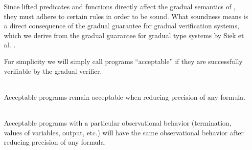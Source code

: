 Since lifted predicates and functions directly affect the gradual semantics of \gvl, they must adhere to certain rules in order to be sound.
What soundness means is a direct consequence of the gradual guarantee for gradual verification systems, which we derive from the gradual guarantee for gradual type systems by Siek et al. \cite{siek2015refined}.

For simplicity we will simply call programs “acceptable” if they are successfully verifiable by the gradual verifier.

\begin{definition}
    \label{grad-guarantee-static}~\\
    Acceptable programs remain acceptable when reducing precision of any formula.
\end{definition}

\begin{definition}
    \label{grad-guarantee-dynamic}~\\
    Acceptable programs with a particular observational behavior (termination, values of variables, output, etc.) will have the same observational behavior after reducing precision of any formula.
\end{definition}

\begin{comment}




PROBABLY UNNECESSARY:\\
Because of its generality, we will pursue the approach introduced in section \ref{ssec:wildcard-with-upper} for the remainder of this chapter.
As concretization we chose the semantic version, as it is more flexible than the syntactic one in practice.
For reference, the full definitions:
\begin{align*} 
&\text{Syntax:}\\
&\grad{\phi} ::= \phi ~|~ \withqmGen{\phi}\\
\\
&\text{Concretization:}\\
&\gamma(\phi) = \{~ \phi ~\}     \quad\quad \forall \phi \in \setFormulaA\\
&\gamma(\withqmGen{\phi}) = \{~ \phi' \in \setFormulaA ~|~ \phiImplies{\phi'}{\phi} ~\}\\
&\gamma(\grad{\phi}) = \emptyset    \quad\textit{otherwise}
\end{align*}
\end{comment}
